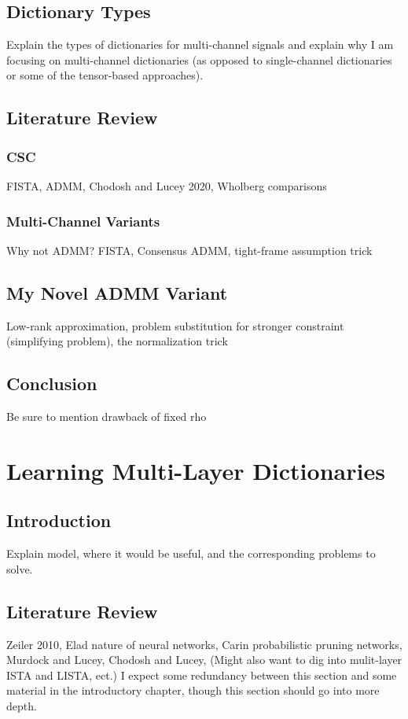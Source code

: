 \documentclass{article}
\begin{document}
\subsection{Dictionary Types}
Explain the types of dictionaries for multi-channel signals and explain why I am focusing on multi-channel dictionaries (as opposed to single-channel dictionaries or some of the tensor-based approaches).
\subsection{Literature Review}
\subsubsection{CSC}
FISTA, ADMM, Chodosh and Lucey 2020, Wholberg comparisons
\subsubsection{Multi-Channel Variants}
Why not ADMM? FISTA, Consensus ADMM, tight-frame assumption trick
\subsection{My Novel ADMM Variant}
Low-rank approximation, problem substitution for stronger constraint (simplifying problem), the normalization trick
\subsection{Conclusion}
Be sure to mention drawback of fixed rho

\section{Learning Multi-Layer Dictionaries}
\subsection{Introduction}
Explain model, where it would be useful, and the corresponding problems to solve.
\subsection{Literature Review}
Zeiler 2010, Elad nature of neural networks, Carin probabilistic pruning networks, Murdock and Lucey, Chodosh and Lucey, (Might also want to dig into mulit-layer ISTA and LISTA, ect.) I expect some redundancy between this section and some material in the introductory chapter, though this section should go into more depth.
\end{document}
